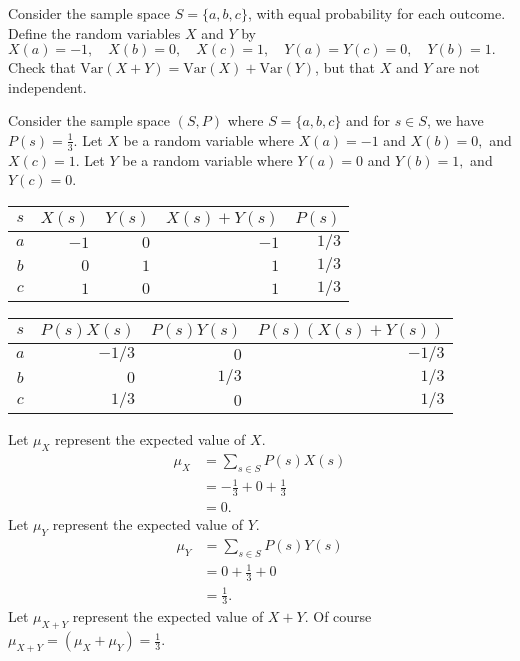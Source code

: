 \documentclass{article}
\theoremstyle{definition}
\begin{document}
\begin{question}
    Consider the sample space $S = \{ a, b, c \}$, with equal probability for each outcome. Define the random variables $X$ and  
    $Y$ by $X(a) = -1, \quad X(b) = 0, \quad X(c) = 1, \quad Y(a) = Y(c) = 0, \quad Y(b) = 1.$ 
    Check that $\mathrm{Var}(X+Y) = \mathrm{Var}(X) + \mathrm{Var}(Y)$, but that $X$ and $Y$ are not independent.
\end{question}
\begin{solution}
Consider the sample space $(S,P)$ where $S=\{a,b,c\}$ and for $s\in S$, we have $P(s)=\frac{1}{3}$. Let $X$ be a random variable where $X(a)=-1$ and $X(b)=0,$ and $X(c)=1$. Let $Y$ be a random variable where $Y(a)=0$ and $Y(b)=1,$ and $Y(c)=0$.

\end{solution}
\begin{center}
\begin{tabular}{c|r|r|r|r}
$s$&$X(s)$&$Y(s)$&$X(s)+Y(s)$&$P(s)$\\\hline
$a$&$-1$&$0$&$-1$&$1/3$\\
$b$&$0$&$1$&$1$&$1/3$\\
$c$&$1$&$0$&$1$&$1/3$\\
\end{tabular}
\end{center}

\begin{center}
\begin{tabular}{c|r|r|r}
$s$&$P(s)X(s)$&$P(s)Y(s)$&$P(s)(X(s)+Y(s))$\\\hline
$a$&$-1/3$&$0$&$-1/3$\\
$b$&$0$&$1/3$&$1/3$\\
$c$&$1/3$&$0$&$1/3$\\
\end{tabular}
\end{center}
Let $\mu_X$ represent the expected value of $X$. 
\begin{align*}
\mu_X
&=\sum_{s\in S}{P(s)X(s)}\\
&=-\frac{1}{3}+0+\frac{1}{3}\\
&=0.
\end{align*}
Let $\mu_Y$ represent the expected value of $Y$.
\begin{align*}
\mu_Y
&=\sum_{s\in S}{P(s)Y(s)}\\
&=0+\frac{1}{3}+0\\
&=\frac{1}{3}.
\end{align*}
Let $\mu_{X+Y}$ represent the expected value of $X+Y$. Of course $\mu_{X+Y}=(\mu_{X}+\mu_{Y})=\frac{1}{3}$.
\end{document}
